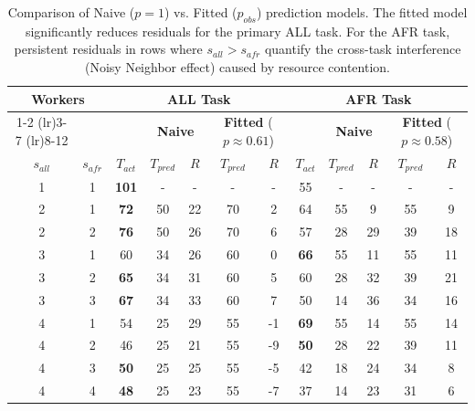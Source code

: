 \documentclass[a4paper, 12pt]{article}
\begin{document}
	\begin{table}[h!]
		\centering
		\renewcommand{\arraystretch}{1.2}
		\setlength{\tabcolsep}{3pt}
		\footnotesize
		
		\begin{tabular}{cc||c|cc|cc||c|cc|cc}
			\toprule
			\multicolumn{2}{c||}{\textbf{Workers}} & 
			\multicolumn{5}{c||}{\textbf{ALL Task}} & 
			\multicolumn{5}{c}{\textbf{AFR Task}} \\
			
			\cmidrule(lr){1-2} \cmidrule(lr){3-7} \cmidrule(lr){8-12} 
			
			& & & 
			\multicolumn{2}{c|}{\textbf{Naive}} & 
			\multicolumn{2}{c||}{\textbf{Fitted} ($p\approx0.61$)} & & 
			\multicolumn{2}{c|}{\textbf{Naive}} & 
			\multicolumn{2}{c}{\textbf{Fitted} ($p\approx0.58$)} \\
			
			$s_{all}$ & $s_{afr}$ & 
			$T_{act}$ & $T_{pred}$ & $R$ & $T_{pred}$ & $R$ & 
			$T_{act}$ & $T_{pred}$ & $R$ & $T_{pred}$ & $R$ \\
			\midrule
			
			1 & 1 & \textbf{101} & - & - & - & - & 55 & - & - & - & - \\
			2 & 1 & \textbf{72} & 50 & 22 & 70 & 2 & 64 & 55 & 9 & 55 & 9 \\
			2 & 2 & \textbf{76} & 50 & 26 & 70 & 6 & 57 & 28 & 29 & 39 & 18 \\
			3 & 1 & 60 & 34 & 26 & 60 & 0 & \textbf{66} & 55 & 11 & 55 & 11 \\ 
			3 & 2 & \textbf{65} & 34 & 31 & 60 & 5 & 60 & 28 & 32 & 39 & 21 \\
			3 & 3 & \textbf{67} & 34 & 33 & 60 & 7 & 50 & 14 & 36 & 34 & 16 \\
			4 & 1 & 54 & 25 & 29 & 55 & -1 & \textbf{69} & 55 & 14 & 55 & 14 \\
			4 & 2 & 46 & 25 & 21 & 55 & -9 & \textbf{50} & 28 & 22 & 39 & 11 \\
			4 & 3 & \textbf{50} & 25 & 25 & 55 & -5 & 42 & 18 & 24 & 34 & 8 \\
			4 & 4 & \textbf{48} & 25 & 23 & 55 & -7 & 37 & 14 & 23 & 31 & 6 \\
			\bottomrule
		\end{tabular}
			\caption{Comparison of Naive ($p=1$) vs. Fitted ($p_{obs}$) prediction models. The fitted model significantly reduces residuals for the primary ALL task. For the AFR task, persistent residuals in rows where $s_{all} > s_{afr}$ quantify the cross-task interference (Noisy Neighbor effect) caused by resource contention.}
		\label{tab:freq_results_comparison}
	\end{table}
\end{document}
